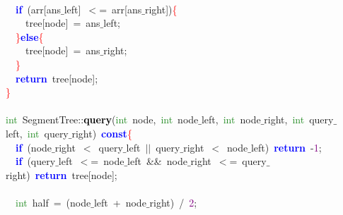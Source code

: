 \mbox{} \\
\mbox{}\ \ \textbf{\textcolor{Blue}{if}}\ \textcolor{BrickRed}{(}arr\textcolor{BrickRed}{[}ans$\_$left\textcolor{BrickRed}{]}\ \textcolor{BrickRed}{$<$=}\ arr\textcolor{BrickRed}{[}ans$\_$right\textcolor{BrickRed}{])}\textcolor{Red}{\{} \\
\mbox{}\ \ \ \ tree\textcolor{BrickRed}{[}node\textcolor{BrickRed}{]}\ \textcolor{BrickRed}{=}\ ans$\_$left\textcolor{BrickRed}{;} \\
\mbox{}\ \ \textcolor{Red}{\}}\textbf{\textcolor{Blue}{else}}\textcolor{Red}{\{} \\
\mbox{}\ \ \ \ tree\textcolor{BrickRed}{[}node\textcolor{BrickRed}{]}\ \textcolor{BrickRed}{=}\ ans$\_$right\textcolor{BrickRed}{;} \\
\mbox{}\ \ \textcolor{Red}{\}} \\
\mbox{}\ \ \textbf{\textcolor{Blue}{return}}\ tree\textcolor{BrickRed}{[}node\textcolor{BrickRed}{];} \\
\mbox{}\textcolor{Red}{\}} \\
\mbox{} \\
\mbox{}\textcolor{ForestGreen}{int}\ SegmentTree\textcolor{BrickRed}{::}\textbf{\textcolor{Black}{query}}\textcolor{BrickRed}{(}\textcolor{ForestGreen}{int}\ node\textcolor{BrickRed}{,}\ \textcolor{ForestGreen}{int}\ node$\_$left\textcolor{BrickRed}{,}\ \textcolor{ForestGreen}{int}\ node$\_$right\textcolor{BrickRed}{,}\ \textcolor{ForestGreen}{int}\ query$\_$left\textcolor{BrickRed}{,}\ \textcolor{ForestGreen}{int}\ query$\_$right\textcolor{BrickRed}{)}\ \textbf{\textcolor{Blue}{const}}\textcolor{Red}{\{} \\
\mbox{}\ \ \textbf{\textcolor{Blue}{if}}\ \textcolor{BrickRed}{(}node$\_$right\ \textcolor{BrickRed}{$<$}\ query$\_$left\ \textcolor{BrickRed}{$|$$|$}\ query$\_$right\ \textcolor{BrickRed}{$<$}\ node$\_$left\textcolor{BrickRed}{)}\ \textbf{\textcolor{Blue}{return}}\ \textcolor{BrickRed}{-}\textcolor{Purple}{1}\textcolor{BrickRed}{;} \\
\mbox{}\ \ \textbf{\textcolor{Blue}{if}}\ \textcolor{BrickRed}{(}query$\_$left\ \textcolor{BrickRed}{$<$=}\ node$\_$left\ \textcolor{BrickRed}{\&\&}\ node$\_$right\ \textcolor{BrickRed}{$<$=}\ query$\_$right\textcolor{BrickRed}{)}\ \textbf{\textcolor{Blue}{return}}\ tree\textcolor{BrickRed}{[}node\textcolor{BrickRed}{];} \\
\mbox{} \\
\mbox{}\ \ \textcolor{ForestGreen}{int}\ half\ \textcolor{BrickRed}{=}\ \textcolor{BrickRed}{(}node$\_$left\ \textcolor{BrickRed}{+}\ node$\_$right\textcolor{BrickRed}{)}\ \textcolor{BrickRed}{/}\ \textcolor{Purple}{2}\textcolor{BrickRed}{;} \\
